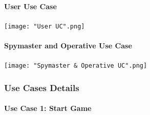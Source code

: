 \documentclass[10pt, a4paper]{article}
\begin{document}
		    \clearpage
		
			\paragraph{User Use Case}
			
			\begin{center}
				\texttt{[image: "User UC".png]}
			\end{center} 
			
			\paragraph{Spymaster and Operative Use Case}
			
			\begin{center}
				\texttt{[image: "Spymaster \& Operative UC".png]}
			\end{center}
		
		\subsubsection{Use Cases Details}
		
			\paragraph{Use Case 1: Start Game }
			
\end{document}

